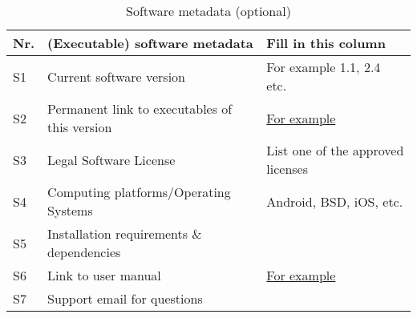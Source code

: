 \begin{table}
\begin{tabular}{lll}
\hline
\textbf{Nr.} & \textbf{(Executable) software metadata} & \textbf{Fill in this column} \\
\hline
S1 & Current software version & For example 1.1, 2.4 etc. \\
\hline
S2 & Permanent link to executables of this version  & \href{https://github.com/combogenomics/$ $DuctApe/releases/tag/DuctApe-0.16.4}{For example} \\
\hline
S3 & Legal Software License & List one of the approved licenses \\
\hline
S4 & Computing platforms/Operating Systems & Android, BSD, iOS, etc.  \\
\hline
S5 & Installation requirements \& dependencies & \\
\hline
S6 & Link to user manual  & \href{http://mozart.github.io/documentation}{For example} \\
\hline
S7 & Support email for questions & \\
\hline
\end{tabular}
\caption{Software metadata (optional)}
\end{table}
  